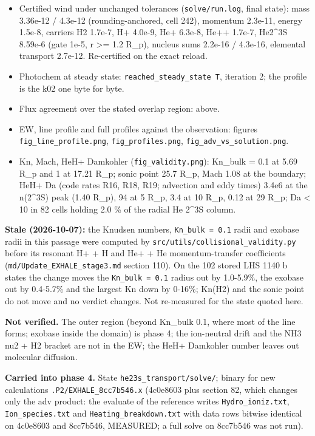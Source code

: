\documentclass[english,a4paper]{my_memo}
\providecommand{\tightlist}{\setlength{\itemsep}{0pt}\setlength{\parskip}{0pt}}
\begin{document}
\begin{itemize}
\tightlist
\item
  Certified wind under unchanged tolerances (\texttt{solve/run.log}, final state):
  mass 3.36e-12 / 4.3e-12 (rounding-anchored, cell 242), momentum 2.3e-11,
  energy 1.5e-8, carriers H2 1.7e-7, H+ 4.0e-9, He+ 6.3e-8, He++ 1.7e-7,
  He2\^{}3S 8.59e-6 (gate 1e-5, r \textgreater= 1.2 R\_p), nucleus sums 2.2e-16 /
  4.3e-16, elemental transport 2.7e-12. Re-certified on the exact reload.
\item
  Photochem at steady state: \texttt{reached\_steady\_state\ T}, iteration 2; the
  profile is the k02 one byte for byte.
\item
  Flux agreement over the stated overlap region: above.
\item
  EW, line profile and full profiles against the observation: figures
  \texttt{fig\_line\_profile.png}, \texttt{fig\_profiles.png}, \texttt{fig\_adv\_vs\_solution.png}.
\item
  Kn, Mach, HeH+ Damkohler (\texttt{fig\_validity.png}): Kn\_bulk = 0.1 at
  5.69 R\_p and 1 at 17.21 R\_p; sonic point 25.7 R\_p, Mach 1.08 at the
  boundary; HeH+ Da (code rates R16, R18, R19; advection and eddy times)
  3.4e6 at the n(2\^{}3S) peak (1.40 R\_p), 94 at 5 R\_p, 3.4 at 10 R\_p, 0.12
  at 29 R\_p; Da \textless{} 10 in 82 cells holding 2.0 \% of the radial He 2\^{}3S column.
\end{itemize}

\textbf{Stale (2026-10-07):} the Knudsen numbers, \texttt{Kn\_bulk\ =\ 0.1} radii and exobase radii in this passage were computed by \texttt{src/utils/collisional\_validity.py} before its resonant H+ + H and He+ + He momentum-transfer coefficients (\texttt{md/Update\_EXHALE\_stage3.md} section 110). On the 102 stored LHS 1140 b states the change moves the \texttt{Kn\_bulk\ =\ 0.1} radius out by 1.0-5.9\%, the exobase out by 0.4-5.7\% and the largest Kn down by 0-16\%; Kn(H2) and the sonic point do not move and no verdict changes. Not re-measured for the state quoted here.

\textbf{Not verified.} The outer region (beyond Kn\_bulk 0.1, where most of the
line forms; exobase inside the domain) is phase 4; the ion-neutral drift
and the NH3 nu2 + H2 bracket are not in the EW; the HeH+ Damkohler number
leaves out molecular diffusion.

\textbf{Carried into phase 4.} State \texttt{he23s\_transport/solve/}; binary for new
calculations \texttt{.P2/EXHALE\_8cc7b546.x} (4c0e8603 plus section 82, which
changes only the adv product: the evaluate of the reference writes
\texttt{Hydro\_ioniz.txt}, \texttt{Ion\_species.txt} and \texttt{Heating\_breakdown.txt} with data
rows bitwise identical on 4c0e8603 and 8cc7b546, MEASURED; a full solve
on 8cc7b546 was not run).
\end{document}
